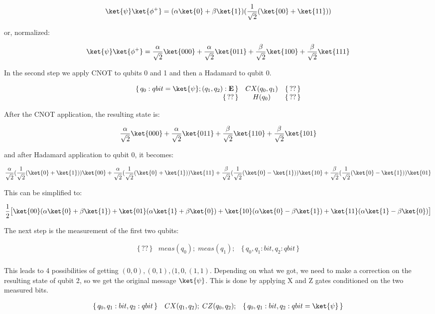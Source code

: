 \documentclass[acmsmall,nonacm,review,timestamp]{acmart}
\newcommand{\E}{\ensuremath{\mathbf{E}}\xspace}
\newcommand\hoare[3]{\{\,#1\,\}&#2&\{\,#3\,\}}
\begin{document}
\begin{enumerate}
\[  \ket{\psi}\ket{\phi^+} = (\alpha\ket{0} + \beta\ket{1})(\frac{1}{\sqrt{2}}(\ket{00} + \ket{11})) \]

or, normalized:

\[  \ket{\psi}\ket{\phi^+} = \frac{\alpha}{\sqrt{2}}\ket{000} + \frac{\alpha}{\sqrt{2}}\ket{011} + \frac{\beta}{\sqrt{2}}\ket{100} + \frac{\beta}{\sqrt{2}}\ket{111} \]

In the second step we apply CNOT to qubits 0 and 1 and then a Hadamard to qubit 0.

\[ \begin{array}{rcl}
\hoare{q_0: qbit = \ket{\psi}; (q_1,q_2) : \E}{CX(q_0, q_1)}{??} \\
\hoare{??}{H(q_0)}{??} \\
\end{array} \]

After the CNOT application, the resulting state is:

\[ \frac{\alpha}{\sqrt{2}}\ket{000} + \frac{\alpha}{\sqrt{2}}\ket{011} + \frac{\beta}{\sqrt{2}}\ket{110} + \frac{\beta}{\sqrt{2}}\ket{101} \]

and after Hadamard application to qubit 0, it becomes:

\[ \frac{\alpha}{\sqrt{2}}(\frac{1}{\sqrt{2}}(\ket{0} + \ket{1}))\ket{00} + \frac{\alpha}{\sqrt{2}}(\frac{1}{\sqrt{2}}(\ket{0} + \ket{1}))\ket{11} + \frac{\beta}{\sqrt{2}}(\frac{1}{\sqrt{2}}(\ket{0} - \ket{1}))\ket{10} + \frac{\beta}{\sqrt{2}}(\frac{1}{\sqrt{2}}(\ket{0} - \ket{1}))\ket{01} \]

This can be simplified to:

\[ \frac{1}{2}\big[\ket{00}(\alpha\ket{0} + \beta\ket{1}) + \ket{01}(\alpha\ket{1} + \beta\ket{0}) + \ket{10}(\alpha\ket{0} - \beta\ket{1}) + \ket{11}(\alpha\ket{1} - \beta\ket{0})\big] \]

The next step is the measurement of the first two qubits:

\[ \begin{array}{rcl}
\hoare{??}{meas(q_0); \; meas(q_1);}{q_0, q_1 : bit, q_2: qbit}\\
\end{array} \]

This leads to 4 possibilities of getting $(0, 0), (0, 1), (1, 0, (1, 1)$. Depending on what we got, we need to make a correction on the resulting state of qubit 2, so we get the original message $\ket{\psi}$. This is done by applying X and Z gates conditioned on the two measured bits.

\[ \begin{array}{rcl}
\hoare{q_0, q_1 : bit, q_2: qbit}{CX(q_1, q_2); \; CZ(q_0, q_2);}{q_0, q_1 : bit, q_2: qbit = \ket{\psi}}\\
\end{array} \]


\end{enumerate}
\end{document}

